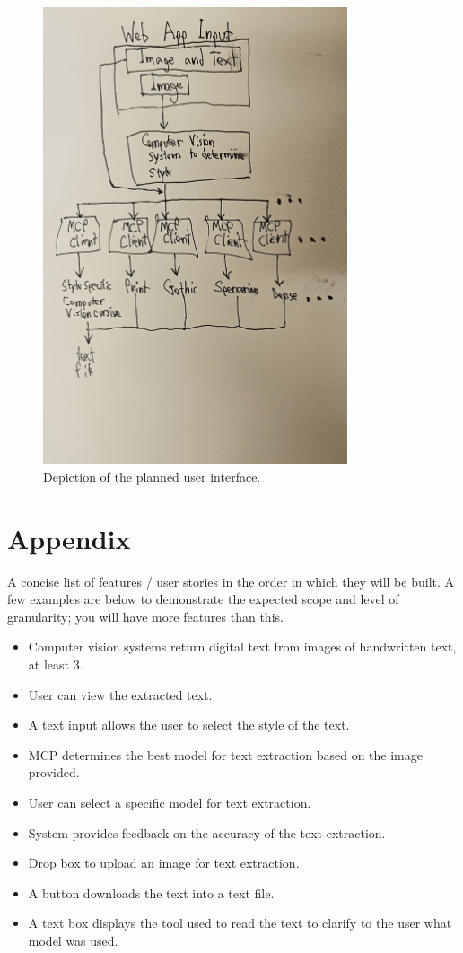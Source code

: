 \documentclass[12pt]{article}
\begin{document}
	\begin{figure}[htbp]
        \centering
		\includegraphics[width=0.8\textwidth]{./1000026679.jpg}
        \caption{Depiction of the planned user interface.}
        \label{fig:myfigure1}
    \end{figure}
\newpage
\section*{Appendix}
A concise list of features / user stories in the order in which they will be built. A few examples are below to demonstrate the expected scope and level of granularity; you will have more features than this.
\begin{itemize}
	\item Computer vision systems return digital text from images of handwritten text, at least 3.
	\item User can view the extracted text.
	\item A text input allows the user to select the style of the text.
	\item MCP determines the best model for text extraction based on the image provided.
	\item User can select a specific model for text extraction.
	\item System provides feedback on the accuracy of the text extraction.
	\item Drop box to upload an image for text extraction.
	\item A button downloads the text into a text file.
	\item A text box displays the tool used to read the text to clarify to the user what model was used.
\end{itemize}




\end{document}
